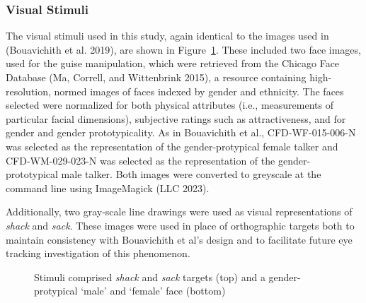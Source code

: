 \documentclass[
  letterpaper,
  DIV=11,
  numbers=noendperiod]{scrartcl}
\begin{document}
\subsubsection{Visual Stimuli}\label{visual-stimuli}

The visual stimuli used in this study, again identical to the images
used in (Bouavichith et al. 2019), are shown in Figure~\ref{fig-visual}.
These included two face images, used for the guise manipulation, which
were retrieved from the Chicago Face Database (Ma, Correll, and
Wittenbrink 2015), a resource containing high-resolution, normed images
of faces indexed by gender and ethnicity. The faces selected were
normalized for both physical attributes (i.e., measurements of
particular facial dimensions), subjective ratings such as
attractiveness, and for gender and gender prototypicality. As in
Bouavichith et al., CFD-WF-015-006-N was selected as the representation
of the gender-protypical female talker and CFD-WM-029-023-N was selected
as the representation of the gender-prototypical male talker. Both
images were converted to greyscale at the command line using ImageMagick
(LLC 2023).

Additionally, two gray-scale line drawings were used as visual
representations of \emph{shack} and \emph{sack}. These images were used
in place of orthographic targets both to maintain consistency with
Bouavichith et al's design and to facilitate future eye tracking
investigation of this phenomenon.

\begin{figure}


\caption{\label{fig-visual}Stimuli comprised \emph{shack} and
\emph{sack} targets (top) and a gender-protypical `male' and `female'
face (bottom)}

\end{figure}%
\end{document}
